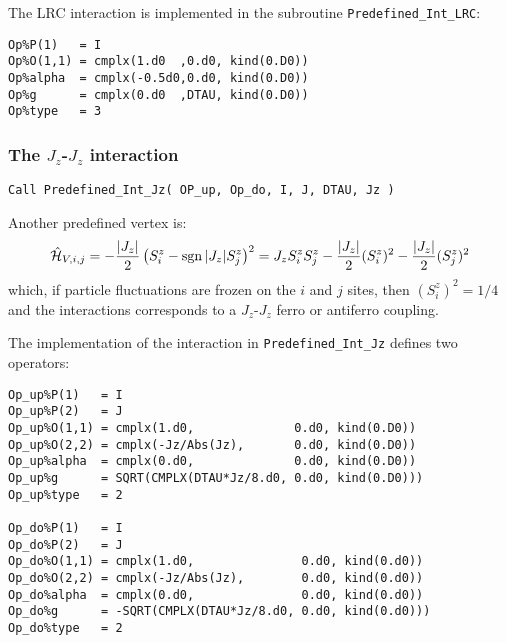 The LRC interaction is implemented in the subroutine \texttt{Predefined\_Int\_LRC}:
\begin{lstlisting}[style=fortran]
Op%P(1)   = I
Op%O(1,1) = cmplx(1.d0  ,0.d0, kind(0.D0))
Op%alpha  = cmplx(-0.5d0,0.d0, kind(0.D0))
Op%g      = cmplx(0.d0  ,DTAU, kind(0.D0)) 
Op%type   = 3

\end{lstlisting}


\subsubsection{The $J_z$-$J_z$ interaction}

\begin{lstlisting}[style=fortran]
Call Predefined_Int_Jz( OP_up, Op_do, I, J, DTAU, Jz )
\end{lstlisting}

Another predefined vertex is:
\begin{align}
\hat{\mathcal{H}}_{V,i,j} =
- \frac{|J_z|}{2}  \left( S^{z}_i - \operatorname{sgn}|J_z| S^{z}_j \right)^2 =
J_z  S^{z}_i  S^{z}_j  - \frac{|J_z|}{2} (S^{z}_i)^2 - \frac{|J_z|}{2}(S^{z}_j)^2 
\end{align} 
which, if particle fluctuations are frozen on the $i$ and $j$ sites, then $(S^{z}_i)^2 = 1/4$ and the interactions corresponds to a $J_z$-$J_z$ ferro or antiferro coupling.

The implementation of the interaction in \texttt{Predefined\_Int\_Jz} defines two operators:
\begin{lstlisting}[style=fortran]
Op_up%P(1)   = I
Op_up%P(2)   = J
Op_up%O(1,1) = cmplx(1.d0,              0.d0, kind(0.D0))
Op_up%O(2,2) = cmplx(-Jz/Abs(Jz),       0.d0, kind(0.D0))
Op_up%alpha  = cmplx(0.d0,              0.d0, kind(0.D0))
Op_up%g      = SQRT(CMPLX(DTAU*Jz/8.d0, 0.d0, kind(0.D0))) 
Op_up%type   = 2

Op_do%P(1)   = I
Op_do%P(2)   = J
Op_do%O(1,1) = cmplx(1.d0,               0.d0, kind(0.d0))
Op_do%O(2,2) = cmplx(-Jz/Abs(Jz),        0.d0, kind(0.d0))
Op_do%alpha  = cmplx(0.d0,               0.d0, kind(0.d0))
Op_do%g      = -SQRT(CMPLX(DTAU*Jz/8.d0, 0.d0, kind(0.d0))) 
Op_do%type   = 2

\end{lstlisting}
